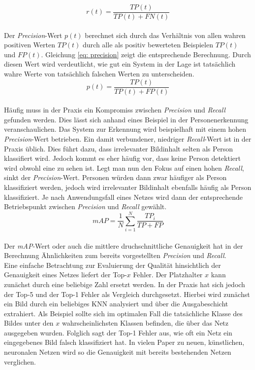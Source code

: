 		\begin{equation}
		r(t)=\frac{TP(t)}{TP(t)+FN(t)}
		\label{eq: recall}
		\end{equation}\\
		
		Der \textit{Precision}-Wert $p(t)$ berechnet sich durch das Verhältnis von allen wahren positiven Werten $TP(t)$ durch alle als positiv bewerteten Beispielen $TP(t)$ und $FP(t)$. Gleichung \ref{eq: precision} zeigt die entsprechende Berechnung. Durch diesen Wert wird verdeutlicht, wie gut ein System in der Lage ist tatsächlich wahre Werte von tatsächlich falschen Werten zu unterscheiden.\\
		
		\begin{equation}
		p(t)=\frac{TP(t)}{TP(t)+FP(t)}
		\label{eq: precision}
		\end{equation}\\
		
		Häufig muss in der Praxis ein Kompromiss zwischen \textit{Precision} und \textit{Recall} gefunden werden. Dies lässt sich anhand eines Beispiel in der Personenerkennung veranschaulichen. Das System zur Erkennung wird beispielhaft mit einem hohen \textit{Precision}-Wert betrieben. Ein damit verbundener, niedriger \textit{Recall}-Wert ist in der Praxis üblich. Dies führt dazu, dass irrelevanter Bildinhalt selten als Person klassifiert wird. Jedoch kommt es eher häufig vor, dass keine Person detektiert wird obwohl eine zu sehen ist. Legt man nun den Fokus auf einen hohen \textit{Recall}, sinkt der \textit{Precision}-Wert. Personen würden dann zwar häufiger als Person klassifiziert werden, jedoch wird irrelevanter Bildinhalt ebenfalls häufig als Person klassifiziert. Je nach Anwendungsfall eines Netzes wird dann der entsprechende Betriebspunkt zwischen \textit{Precision} und \textit{Recall} gewählt.\\
		
		\begin{equation}
		mAP = \frac{1}{N}\sum_{i=1}^{N}\frac{TP_i}{TP+FP}
		\end{equation}\\
		
		Der \textit{mAP}-Wert oder auch die mittlere druchschnittliche Genauigkeit hat in der Berechnung Ähnlichkeiten zum bereits vorgestellten \textit{Precision} und \textit{Recall}. \\
		
		Eine einfache Betrachtung zur Evaluierung der Qualität hinsichtlich der Genauigkeit eines Netzes liefert der Top-$x$ Fehler. Der Platzhalter $x$ kann zunächst durch eine beliebige Zahl ersetzt werden. In der Praxis hat sich jedoch der Top-5 und der Top-1 Fehler als Vergleich durchgesetzt. Hierbei wird zunächst ein Bild durch ein beliebiges KNN analysiert und über die Ausgabeschicht extrahiert. Als Beispiel sollte sich im optimalen Fall die tatsächliche Klasse des Bildes unter den $x$ wahrscheinlichsten Klassen befinden, die über das Netz ausgegeben wurden. Folglich sagt der Top-1 Fehler aus, wie oft ein Netz ein eingegebenes Bild falsch klassifiziert hat. In vielen Paper zu neuen, künstlichen, neuronalen Netzen wird so die Genauigkeit mit bereits bestehenden Netzen verglichen.
		
